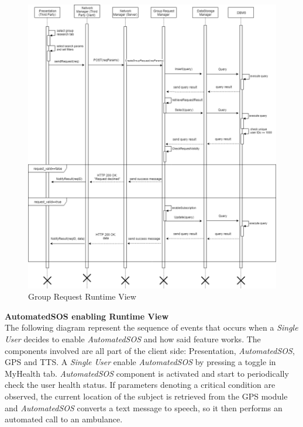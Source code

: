 \documentclass[titlepage]{article}
\begin{document}
	\begin{figure}[H]
		\center
		\includegraphics[width=15cm]{GroupRequest.png}
		\caption{Group Request Runtime View}
		\label{fig:GRPREQ}
	\end{figure}
	\noindent
	{\bf AutomatedSOS enabling Runtime View }\\ 
	The following diagram represent the sequence of events that occurs when a {\it Single User} decides to enable {\it AutomatedSOS} and how said feature works.
	The components involved are all part of the client side: Presentation, {\it AutomatedSOS}, GPS and TTS. A {\it Single User} enable {\it AutomatedSOS} by pressing a toggle in MyHealth tab.
	{\it AutomatedSOS} component is activated and start to periodically check the user health status. If parameters denoting a critical condition are observed, the current location of the subject is retrieved from the GPS module and {\it AutomatedSOS} converts a text message to speech, so it then performs an automated call to an ambulance.
	
\end{document}
